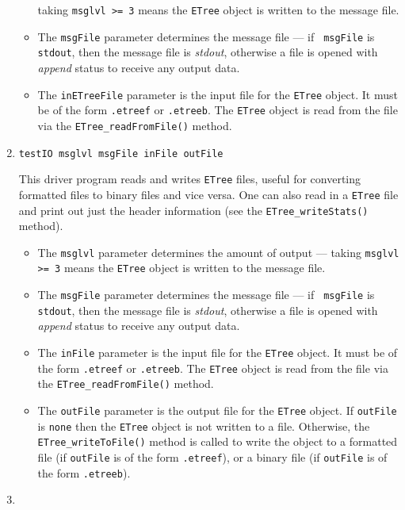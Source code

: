 \begin{enumerate}
\begin{itemize}
taking {\tt msglvl >= 3} means the {\tt ETree} object is written
to the message file.
\item
The {\tt msgFile} parameter determines the message file --- if {\tt
msgFile} is {\tt stdout}, then the message file is {\it stdout},
otherwise a file is opened with {\it append} status to receive any
output data.
\item
The {\tt inETreeFile} parameter is the input file for the {\tt ETree}
object. It must be of the form {\tt *.etreef} or {\tt *.etreeb}.
The {\tt ETree} object is read from the file via the
{\tt ETree\_readFromFile()} method.
\end{itemize}
\item
\begin{verbatim}
testIO msglvl msgFile inFile outFile
\end{verbatim}
This driver program reads and writes {\tt ETree} files, useful for
converting formatted files to binary files and vice versa.
One can also read in a {\tt ETree} file and print out just the 
header information (see the {\tt ETree\_writeStats()} method).
\par
\begin{itemize}
\item
The {\tt msglvl} parameter determines the amount of output ---
taking {\tt msglvl >= 3} means the {\tt ETree} object is written
to the message file.
\item
The {\tt msgFile} parameter determines the message file --- if {\tt
msgFile} is {\tt stdout}, then the message file is {\it stdout},
otherwise a file is opened with {\it append} status to receive any
output data.
\item
The {\tt inFile} parameter is the input file for the {\tt ETree}
object. It must be of the form {\tt *.etreef} or {\tt *.etreeb}.
The {\tt ETree} object is read from the file via the
{\tt ETree\_readFromFile()} method.
\item
The {\tt outFile} parameter is the output file for the {\tt ETree}
object. 
If {\tt outFile} is {\tt none} then the {\tt ETree} object is not
written to a file. 
Otherwise, the {\tt ETree\_writeToFile()} method is called to write
the object to 
a formatted file (if {\tt outFile} is of the form {\tt *.etreef}),
or
a binary file (if {\tt outFile} is of the form {\tt *.etreeb}).
\end{itemize}
\item

\end{enumerate}

